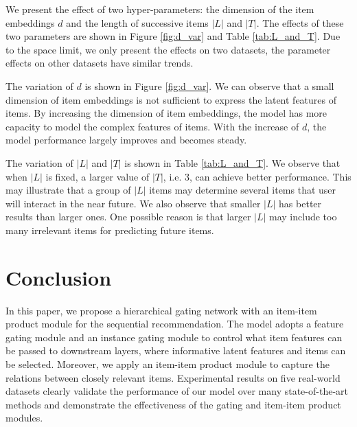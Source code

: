 \documentclass[sigconf]{acmart}
\begin{document}
We present the effect of two hyper-parameters: the dimension of the item embeddings $ d $ and the length of successive items $ |L| $ and $ |T| $. The effects of these two parameters are shown in Figure \ref{fig:d_var} and Table \ref{tab:L_and_T}. Due to the space limit, we only present the effects on two datasets, the parameter effects on other datasets have similar trends.

The variation of $ d $ is shown in Figure \ref{fig:d_var}. We can observe that a small dimension of item embeddings is not sufficient to express the latent features of items. By increasing the dimension of item embeddings, the model has more capacity to model the complex features of items. With the increase of $ d $, the model performance largely improves and becomes steady.

The variation of $ |L|$ and $ |T| $ is shown in Table \ref{tab:L_and_T}. We observe that when $ |L| $ is fixed, a larger value of $ |T| $, i.e. 3, can achieve better performance. This may illustrate that a group of $ |L| $ items may determine several items that user will interact in the near future. We also observe that smaller $ |L| $ has better results than larger ones. One possible reason is that larger $ |L| $ may include too many irrelevant items for predicting future items. 
\section{Conclusion}
In this paper, we propose a hierarchical gating network with an item-item product module for the sequential recommendation. The model adopts a feature gating module and an instance gating module to control what item features can be passed to downstream layers, where informative latent features and items can be selected. Moreover, we apply an item-item product module to capture the relations between closely relevant items. Experimental results on five real-world datasets clearly validate the performance of our model over many state-of-the-art methods and demonstrate the effectiveness of the gating and item-item product modules. 


 
\end{document}
